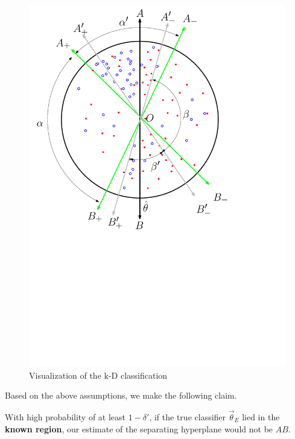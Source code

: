 \begin{figure}[H]
\centering
   \includegraphics[scale=0.5]{texs/classification.pdf}
   \caption{Visualization of the k-D classification}
\label{fig:classification}
\end{figure}


Based on the above assumptions, we make the following claim.
\begin{thm}
With high probability of at least $1-\delta'$,  if the true classifier $\vec{\theta}_E$ lied in the \textbf{known region}, our estimate  of the separating hyperplane would not be $AB$.
\end{thm}



